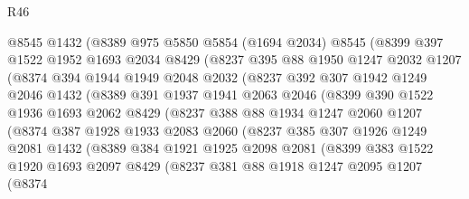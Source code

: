 \begin{lexlean}{R46}
\begin{coremodule}
          @8545
          @1432
          (@8389
            @975
            @5850
            @5854
            (@1694 @2034)
            @8545
            (@8399
              @397
              @1522
              @1952
              @1693
              @2034
              @8429
              (@8237
                @395
                @88
                @1950
                @1247
                @2032
                @1207
                (@8374
                  @394
                  @1944
                  @1949
                  @2048
                  @2032
                  (@8237
                    @392
                    @307
                    @1942
                    @1249
                    @2046
                    @1432
                    (@8389
                      @391
                      @1937
                      @1941
                      @2063
                      @2046
                      (@8399
                        @390
                        @1522
                        @1936
                        @1693
                        @2062
                        @8429
                        (@8237
                          @388
                          @88
                          @1934
                          @1247
                          @2060
                          @1207
                          (@8374
                            @387
                            @1928
                            @1933
                            @2083
                            @2060
                            (@8237
                              @385
                              @307
                              @1926
                              @1249
                              @2081
                              @1432
                              (@8389
                                @384
                                @1921
                                @1925
                                @2098
                                @2081
                                (@8399
                                  @383
                                  @1522
                                  @1920
                                  @1693
                                  @2097
                                  @8429
                                  (@8237
                                    @381
                                    @88
                                    @1918
                                    @1247
                                    @2095
                                    @1207
                                    (@8374

\end{coremodule}
\end{lexlean}
